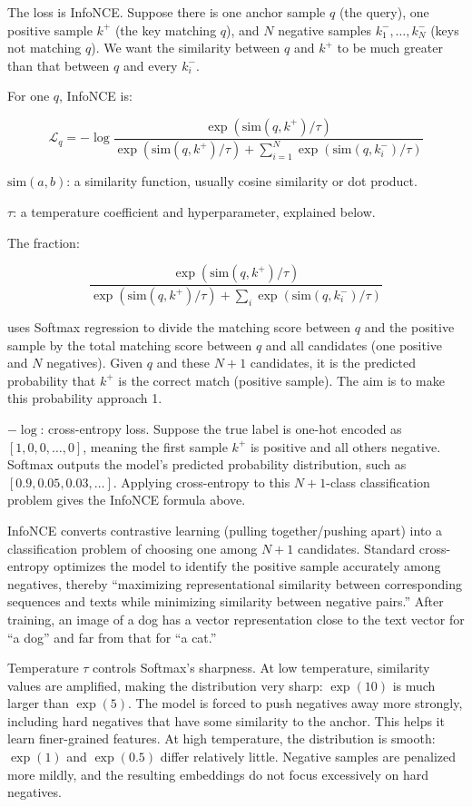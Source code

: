 The loss is InfoNCE. Suppose there is one anchor sample \(q\) (the query), one positive sample \(k^+\) (the key matching \(q\)), and \(N\) negative samples \(k_1^-,\ldots,k_N^-\) (keys not matching \(q\)). We want the similarity between \(q\) and \(k^+\) to be much greater than that between \(q\) and every \(k_i^-\).

For one \(q\), InfoNCE is:

\[
\mathcal{L}_q=-\log \frac{\exp(\mathrm{sim}(q,k^+)/\tau)}
{\exp(\mathrm{sim}(q,k^+)/\tau)+\sum_{i=1}^{N}\exp(\mathrm{sim}(q,k_i^-)/\tau)}
\]

\(\mathrm{sim}(a,b)\): a similarity function, usually cosine similarity or dot product.

\(\tau\): a temperature coefficient and hyperparameter, explained below.

The fraction:

\[
\frac{\exp(\mathrm{sim}(q,k^+)/\tau)}
{\exp(\mathrm{sim}(q,k^+)/\tau)+\sum_i\exp(\mathrm{sim}(q,k_i^-)/\tau)}
\]

uses Softmax regression to divide the matching score between \(q\) and the positive sample by the total matching score between \(q\) and all candidates (one positive and \(N\) negatives). Given \(q\) and these \(N+1\) candidates, it is the predicted probability that \(k^+\) is the correct match (positive sample). The aim is to make this probability approach 1.

\(-\log\): cross-entropy loss. Suppose the true label is one-hot encoded as \([1,0,0,\ldots,0]\), meaning the first sample \(k^+\) is positive and all others negative. Softmax outputs the model's predicted probability distribution, such as \([0.9,0.05,0.03,\ldots]\). Applying cross-entropy to this \(N+1\)-class classification problem gives the InfoNCE formula above.

InfoNCE converts contrastive learning (pulling together/pushing apart) into a classification problem of choosing one among \(N+1\) candidates. Standard cross-entropy optimizes the model to identify the positive sample accurately among negatives, thereby ``maximizing representational similarity between corresponding sequences and texts while minimizing similarity between negative pairs.'' After training, an image of a dog has a vector representation close to the text vector for ``a dog'' and far from that for ``a cat.''

Temperature \(\tau\) controls Softmax's sharpness. At low temperature, similarity values are amplified, making the distribution very sharp: \(\exp(10)\) is much larger than \(\exp(5)\). The model is forced to push negatives away more strongly, including hard negatives that have some similarity to the anchor. This helps it learn finer-grained features. At high temperature, the distribution is smooth: \(\exp(1)\) and \(\exp(0.5)\) differ relatively little. Negative samples are penalized more mildly, and the resulting embeddings do not focus excessively on hard negatives.

